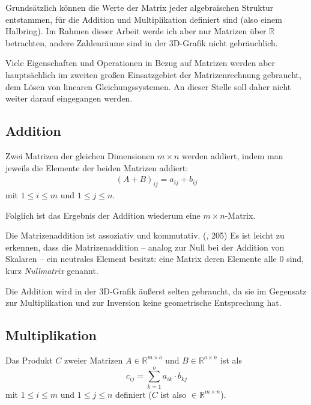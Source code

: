 Grundsätzlich können die Werte der Matrix jeder algebraischen Struktur entstammen, für die Addition und Multiplikation definiert sind (also einem Halbring). Im Rahmen dieser Arbeit werde ich aber nur Matrizen über $\mathbb R$ betrachten, andere Zahlenräume sind in der 3D-Grafik nicht gebräuchlich.

Viele Eigenschaften und Operationen in Bezug auf Matrizen werden aber hauptsächlich im zweiten großen Einsatzgebiet der Matrizenrechnung gebraucht, dem Lösen von linearen Gleichungssystemen. An dieser Stelle soll daher nicht weiter darauf eingegangen werden.

\subsection{Addition}
Zwei Matrizen der gleichen Dimensionen $m \times n$ werden addiert, indem man jeweils die Elemente der beiden Matrizen addiert:
\begin{align}
 (A + B)_{ij} = a_{ij} + b_{ij}%
\end{align}
mit $1 \leq i \leq m$ und $1 \leq j \leq n$.

Folglich ist das Ergebnis der Addition wiederum eine $m \times n$-Matrix.

Die Matrizenaddition ist assoziativ und kommutativ. (\vgl \citep{bronstein}, 205) Es ist leicht zu erkennen, dass die Matrizenaddition -- analog zur Null bei der Addition von Skalaren -- ein neutrales Element besitzt: eine Matrix deren Elemente alle $0$ sind, kurz \emph{Nullmatrix} genannt.

Die Addition wird in der 3D-Grafik äußerst selten gebraucht, da sie im Gegensatz zur Multiplikation und zur Inversion keine geometrische Entsprechung hat.

\subsection{Multiplikation}
Das Produkt $C$ zweier Matrizen $A \in \mathbb{R}^{m \times o}$ und $B \in \mathbb{R}^{o \times n}$ ist als
\begin{equation}
 c_{ij} = \sum_{k=1}^o{a_{ik} \cdot b_{kj}}
\end{equation}
mit $1 \leq i \leq m$ und $1 \leq j \leq n$ definiert ($C$ ist also $\in \mathbb{R}^{m \times n}$).

